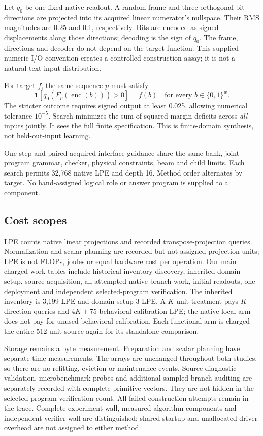 \documentclass[11pt]{article}
\begin{document}
Let $q_0$ be one fixed native readout. A random frame and three orthogonal bit
directions are projected into its acquired linear numerator's nullspace. Their
RMS magnitudes are 0.25 and 0.1, respectively. Bits are encoded as signed
displacements along those directions; decoding is the sign of $q_0$.
The frame, directions and decoder do not depend on the target function. This
supplied numeric I/O convention creates a controlled construction assay; it is
not a natural text-input distribution.

For target $f$, the same sequence $p$ must satisfy
\begin{equation}
 \mathbf{1}[q_0(F_p(\operatorname{enc}(b)))>0]=f(b)
 \quad\text{for every }b\in\{0,1\}^w.\label{eq:bool}
\end{equation}
The stricter outcome requires signed output at least 0.025, allowing numerical
tolerance $10^{-5}$. Search minimizes the sum of squared margin deficits across
\emph{all} inputs jointly. It sees the full finite specification. This is
finite-domain synthesis, not held-out-input learning.

One-step and paired acquired-interface guidance share the same bank, joint
program grammar, checker, physical constraints, beam and child limits. Each
search permits 32,768 native LPE and depth 16. Method order alternates by target.
No hand-assigned logical role or answer program is supplied to a component.

\subsection{Cost scopes}
\label{sec:cost}
LPE counts native linear projections and recorded transpose-projection queries.
Normalization and scalar planning are recorded but not assigned projection
units; LPE is not FLOPs, joules or equal hardware cost per operation. Our main
charged-work tables include historical inventory discovery, inherited domain
setup, source acquisition, all attempted native branch work, initial readouts,
one deployment and independent selected-program verification. The inherited
inventory is 3,199 LPE and domain setup 3 LPE. A $K$-unit treatment pays $K$
direction queries and $4K+75$ behavioral calibration LPE; the native-local arm
does not pay for unused behavioral calibration. Each functional arm is charged
the entire 512-unit source again for its standalone comparison.

Storage remains a byte measurement. Preparation and scalar planning have
separate time measurements. The arrays are unchanged throughout both studies,
so there are no refitting, eviction or maintenance events. Source diagnostic
validation, microbenchmark probes and additional sampled-branch auditing are
separately recorded with complete primitive vectors. They are not hidden in the
selected-program verification count. All failed construction attempts remain
in the trace. Complete experiment wall, measured algorithm components and
independent-verifier wall are distinguished; shared startup and unallocated
driver overhead are not assigned to either method.
\end{document}
